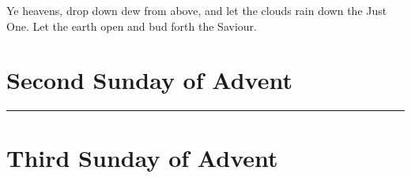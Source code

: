 {{{{	{
		\def\vrlinebreak{T}
		\label{vr-rorate}
		{Ye heavens, drop down dew from above, and let the clouds rain down the Just One.}
		{Let the earth open and bud forth the Saviour.}
	}
	}
}
\def\prepsalmfive{\greseteolcustos{manual}}
\bigskip
\benedicamusdomino{}
}



{
\section{Second Sunday of Advent}
\subtitle{ Class}
\medskip
\def\preanttwo{\needspace{5\baselineskip}}
\def\prepsalmthree{\needspace{5\baselineskip}}
\def\prepsalmfive{\greseteolcustos{manual}}
\def\premag{\def\noeuouae{T}}
\def\premagverses{\greseteolcustos{manual}}

\noindent
{}
\bigskip
\hrule
}



{
\def\beginvrcols{\begin{parcolumns}[rulebetween,colwidths={1=0.45\linewidth}]{2}}

\bigskip
\benedicamusdomino{}
}


{
\section{Third Sunday of Advent}
\subtitle{ Class}

\def\prepsalmfive{\greseteolcustos{manual}}
\def\preantfour{\needspace{15\baselineskip}}
\def\premag{\def\noeuouae{T}
\printnote{When the third Sunday of Advent falls on December 17, the Antiphon \emph{O Sapiéntia} on page \pageref{osapientia} is sung in place of \emph{Beáta es}.}
\medskip

}}}
